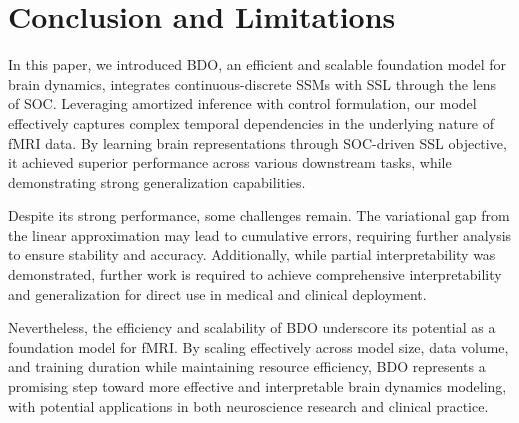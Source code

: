 \vspace{-3mm}
\section{Conclusion and Limitations}
\label{sec:main:conclusion}

In this paper, we introduced BDO, an efficient and scalable foundation model for brain dynamics, integrates continuous-discrete SSMs with SSL through the lens of SOC. Leveraging amortized inference with control formulation, our model effectively captures complex temporal dependencies in the underlying nature of fMRI data. By learning brain representations through SOC-driven SSL objective, it achieved superior performance across various downstream tasks, while demonstrating strong generalization capabilities.

Despite its strong performance, some challenges remain. The variational gap from the linear approximation may lead to cumulative errors, requiring further analysis to ensure stability and accuracy. Additionally, while partial interpretability was demonstrated, further work is required to achieve comprehensive interpretability and generalization for direct use in medical and clinical deployment. 

Nevertheless, the efficiency and scalability of BDO underscore its potential as a foundation model for fMRI. By scaling effectively across model size, data volume, and training duration while maintaining resource efficiency, BDO represents a promising step toward more effective and interpretable brain dynamics modeling, with potential applications in both neuroscience research and clinical practice.